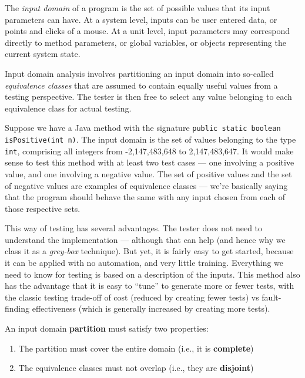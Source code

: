 The {\it input domain} of a program is the set of possible values that its input
parameters can have. At a system level, inputs can be user entered data, or
points and clicks of a mouse. At a unit level, input parameters may correspond
directly to method parameters, or global variables, or objects representing the
current system state. 

Input domain analysis involves partitioning an input domain into so-called {\it
equivalence classes} that are assumed to contain equally useful values from a
testing perspective. The tester is then free to select any value belonging to
each equivalence class for actual testing. 

Suppose we have a Java method with the signature {\tt public static boolean
isPositive(int n)}. The input domain is the set of values belonging to the type
{\tt int}, comprising all integers from -2,147,483,648 to 2,147,483,647. It
would make sense to test this method with at least two test cases --- one
involving a positive value, and one involving a negative value. 
%
The set of positive values and the set of negative values are examples of
equivalence classes --- we're basically saying that the program should behave
the same with any input chosen from each of those respective sets.

This way of testing has several advantages. The tester does not need to
understand the implementation --- although that can help (and hence why we class
it as a {\it grey-box} technique). But yet, it is fairly easy to get started,
because it can be applied with no automation, and very little training.
Everything we need to know for testing is based on a description of the inputs.
This method also has the advantage that it is easy to ``tune'' to generate more
or fewer tests, with the classic testing trade-off of cost (reduced by creating
fewer tests) vs fault-finding effectiveness (which is generally increased by
creating more tests).

An input domain {\bf partition} must satisfy two properties:

\begin{enumerate}
    \item The partition must cover the entire domain (i.e., it is {\bf complete}) 
    \item The equivalence classes must not overlap (i.e., they are {\bf disjoint})
\end{enumerate}

